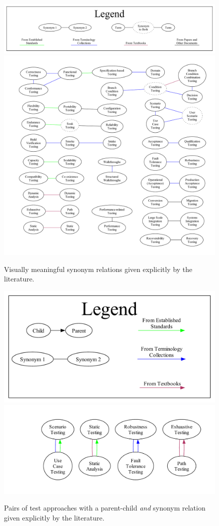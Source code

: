 \ifnotpaper
    \begin{figure}[bt!]
        \centering
        \includegraphics[width=\linewidth]{assets/graphs/manual/expSynLegend.pdf}
        \includegraphics[width=\linewidth]{assets/graphs/manual/expSynGraph.pdf}
        \caption{Visually meaningful synonym relations
            given explicitly by the literature.}\label{fig:expSynGraph}
    \end{figure}
    \clearpage
    \begin{figure}[bt!]
        \centering
        \includegraphics[width=0.48\linewidth]{assets/graphs/manual/expParSynLegend.pdf}
        \includegraphics[width=0.5\linewidth]{assets/graphs/manual/expParSynGraph.pdf}
        \caption{Pairs of test approaches with a parent-child \emph{and} synonym
            relation given explicitly by the literature.}\label{fig:expParSynGraph}
    \end{figure}
\else
\fi


